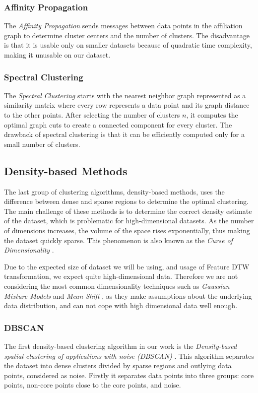 \subsubsection{Affinity Propagation}
The \textit{Affinity Propagation} \cite{vis:affini} sends messages between data points in the affiliation graph to determine cluster centers and the number of clusters.  The disadvantage is that it is usable only on smaller datasets because of quadratic time complexity, making it unusable on our dataset.

\subsubsection{Spectral Clustering}
The \textit{Spectral Clustering} \cite{vis:spectral} starts with the nearest neighbor graph represented as a similarity matrix where every row represents a data point and its graph distance to the other points. After selecting the number of clusters $n$, it computes the optimal graph cuts to create a connected component for every cluster. The drawback of spectral clustering is that it can be efficiently computed only for a small number of clusters.

\subsection{Density-based Methods}
The last group of clustering algorithms, density-based methods, uses the difference between dense and sparse regions to determine the optimal clustering. 
The main challenge of these methods is to determine the correct density estimate of the dataset, which is problematic for high-dimensional datasets. As the number of dimensions increases, the volume of the space rises exponentially, thus making the dataset quickly sparse. This phenomenon is also known as the \textit{Curse of Dimensionality} \cite{exp:curse-of-dim}.

Due to the expected size of dataset we will be using, and usage of Feature DTW transformation, we expect quite high-dimensional data. Therefore we are not considering the most common dimensionality techniques such as \textit{Gaussian Mixture Models} \cite{vis:gauss-mixt} and \textit{Mean Shift} \cite{vis:mean-shift}, as they make assumptions about the underlying data distribution, and can not cope with high dimensional data well enough.

\subsubsection{DBSCAN}
The first density-based clustering algorithm in our work is the \textit{Density-based spatial clustering of applications with noise (DBSCAN)} \cite{vis:dbscan}. This algorithm separates the dataset into dense clusters divided by sparse regions and outlying data points, considered as noise. Firstly it separates data points into three groups: core points, non-core points close to the core points, and noise.

